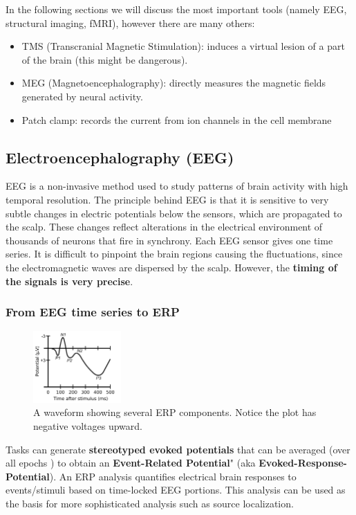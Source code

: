 In the following sections we will discuss the most important tools (namely EEG, structural imaging, fMRI), however there are many others:
\begin{itemize}
    \item TMS (Transcranial Magnetic Stimulation): induces a virtual lesion of a part of the brain (this might be dangerous).
    \item MEG (Magnetoencephalography): directly measures the magnetic fields generated by neural activity.
    \item Patch clamp: records the current from ion channels in the cell membrane
\end{itemize}

\subsection{Electroencephalography (EEG)}
EEG is a non-invasive method used to study patterns of brain activity with high temporal resolution.
The principle behind EEG is that it is sensitive to very subtle changes in electric potentials below the sensors, which are propagated to the scalp. These changes reflect alterations in the electrical environment of thousands of neurons that fire in synchrony. Each EEG sensor gives one time series.
It is difficult to pinpoint the brain regions causing the fluctuations, since the electromagnetic waves are dispersed by the scalp. However, the \textbf{timing of the signals is very precise}.

\subsubsection{From EEG time series to ERP}
\begin{figure}
  \centering \includegraphics[width=0.3\textwidth]{images/ComponentsofERP.png}
  \caption*{A waveform showing several ERP components. Notice the plot has negative voltages upward.}
\end{figure}

Tasks can generate \textbf{stereotyped evoked potentials} that can be averaged (over all epochs \notet) to obtain an \textbf{Event-Related Potential}" (aka \textbf{Evoked-Response-Potential}). An ERP analysis quantifies electrical brain responses to events/stimuli based on time-locked EEG portions. This analysis can be used as the basis for more sophisticated analysis such as source localization.

